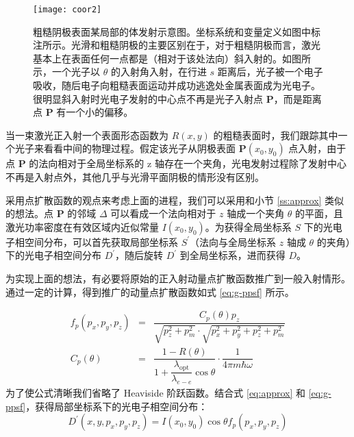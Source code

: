 \begin{figure}[htbp]
\centering
\texttt{[image: coor2]}
\caption{\label{fig:coor_m} 粗糙阴极表面某局部的体发射示意图。坐标系统和变量定义如图中标注所示。光滑和粗糙阴极的主要区别在于，对于粗糙阴极而言，激光基本上在表面任何一点都是（相对于该处法向）斜入射的。如图所示，一个光子以 $\theta$ 的入射角入射，在行进 $s$ 距离后，光子被一个电子吸收，随后电子向粗糙表面运动并成功逃逸处金属表面成为光电子。很明显斜入射时光电子发射的中心点不再是光子入射点 \textbf{P}，而是距离点 \textbf{P} 有一个小的偏移。}
\end{figure}

当一束激光正入射一个表面形态函数为 $R(x, y)$ 的粗糙表面时，我们跟踪其中一个光子来看看中间的物理过程。假定该光子从阴极表面 \textbf{P}$(x_0, y_0)$ 点入射，由于点 \textbf{P} 的法向相对于全局坐标系的 z 轴存在一个夹角，光电发射过程除了发射中心不再是入射点外，其他几乎与光滑平面阴极的情形没有区别。

采用点扩散函数的观点来考虑上面的进程，我们可以采用和小节 \ref{ss:approx} 类似的想法。点 \textbf{P} 的邻域 $\Delta$ 可以看成一个法向相对于 $z$ 轴成一个夹角 $\theta$ 的平面，且激光功率密度在有效区域内近似常量 $I(x_0, y_0)$。为获得全局坐标系 $S$ 下的光电子相空间分布，可以首先获取局部坐标系 $S^{\prime}$（法向与全局坐标系 $z$ 轴成 $\theta$ 的夹角）下的光电子相空间分布 $D^{\prime}$，随后旋转 $D^{\prime}$ 到全局坐标系，进而获得 $D$。

为实现上面的想法，有必要将原始的正入射动量点扩散函数推广到一般入射情形。通过一定的计算，得到推广的动量点扩散函数如式 \ref{eq:g-ppsf} 所示。

\begin{eqnarray}
f_p(p_x,p_y,p_z) &=& \dfrac{C_p(\theta)p_z}{\sqrt{p_z^2+p_m^2}\cdot\sqrt{p_x^2+p_y^2+p_z^2+p_m^2}}\label{eq:g-ppsf}\\
C_p(\theta) &=& \dfrac{1-R(\theta)}{1+\dfrac{\lambda_{\text{opt}}}{\lambda_{e-e}}\cos\theta}\cdot\dfrac{1}{4\pi m\hbar\omega}\nonumber
\end{eqnarray}
为了使公式清晰我们省略了 Heaviside 阶跃函数。结合式 \ref{eq:approx} 和 \ref{eq:g-ppsf}，获得局部坐标系下的光电子相空间分布：
\begin{equation}
D^{\prime}(x, y, p_x, p_y, p_z) = I(x_0,y_0)\cos\theta f_p(p_x, p_y, p_z)
\label{eq:l-dist}
\end{equation}

